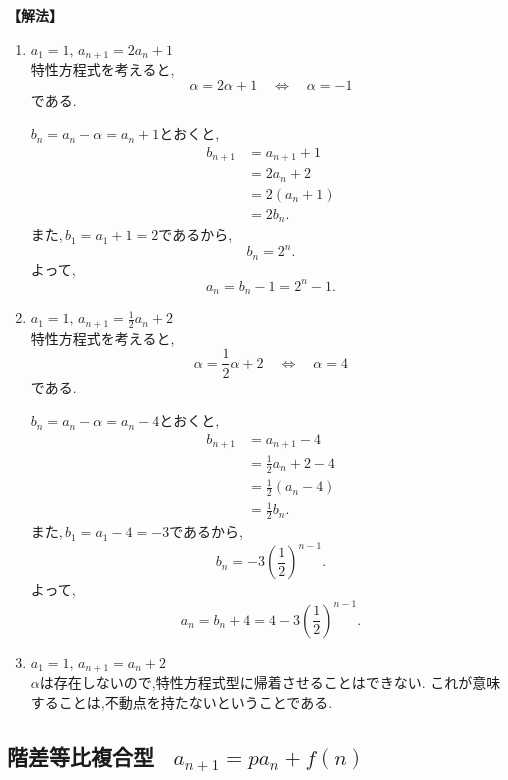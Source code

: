 \documentclass[dvipdfmx,a4paper,11pt,fleqn,openany]{jsbook}
\begin{document}
  \noindent\textbf{【解法】}
  \begin{enumerate}[label=(\arabic*),parsep=3pt]
    \item $\displaystyle a_1=1,\,a_{n+1}=2a_n+1$\\
          特性方程式を考えると,
          \[
            \alpha=2\alpha+1
            \quad\Longleftrightarrow\quad
            \alpha=-1
          \]
          である.

          $b_n=a_n-\alpha=a_n+1$とおくと,
          \begin{align*}
            b_{n+1}
              &=a_{n+1}+1\\
              &=2a_n+2\\
              &=2(a_n+1)\\
              &=2b_n.
          \end{align*}
          また,\,$b_1=a_1+1=2$であるから,
          \[
            b_n=2^n.
          \]
          よって,
          \[
            a_n=b_n-1=2^n-1.
          \]

    \item $\displaystyle a_1=1,\,a_{n+1}=\frac12a_n+2$\\
            特性方程式を考えると,
            \[
              \alpha=\frac12\alpha+2
              \quad\Longleftrightarrow\quad
              \alpha=4
            \]
            である.

            $b_n=a_n-\alpha=a_n-4$とおくと,
            \begin{align*}
              b_{n+1}
                &=a_{n+1}-4\\
                &=\frac12a_n+2-4\\
                &=\frac12(a_n-4)\\
                &=\frac12b_n.
            \end{align*}
            また,\,$b_1=a_1-4=-3$であるから,
            \[
              b_n=-3\left(\frac12\right)^{n-1}.
            \]
            よって,
            \[
              a_n=b_n+4
              =4-3\left(\frac12\right)^{n-1}.
            \]
     \item $\displaystyle a_1=1,\, a_{n+1}=a_n+2$\\
           $\alpha$は存在しないので,特性方程式型に帰着させることはできない.
           これが意味することは,不動点を持たないということである.
  \end{enumerate}

  \subsection{階差等比複合型 \, $\displaystyle a_{n+1}=pa_n+f(n)$}
\end{document}
